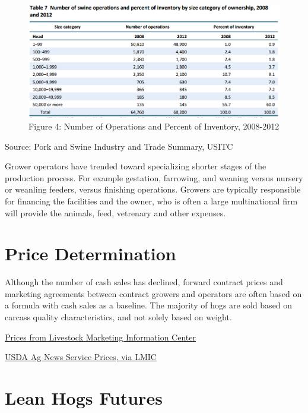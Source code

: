 \documentclass[
  letterpaper,
  DIV=11,
  numbers=noendperiod]{scrreprt}
\begin{document}
\begin{figure}

{\centering \includegraphics{images/numberoperations.png}

}

\caption{Figure 4: Number of Operations and Percent of Inventory,
2008-2012}

\end{figure}

Source: Pork and Swine Industry and Trade Summary, USITC

Grower operators have trended toward specializing shorter stages of the
production process. For example gestation, farrowing, and weaning versus
nursery or weanling feeders, versus finishing operations. Growers are
typically responsible for financing the facilities and the owner, who is
often a large multinational firm will provide the animals, feed,
vetrenary and other expenses.

\hypertarget{price-determination}{%
\section{Price Determination}\label{price-determination}}

Although the number of cash sales has declined, forward contract prices
and marketing agreements between contract growers and operators are
often based on a formula with cash sales as a baseline. The majority of
hogs are sold based on carcass quality characteristics, and not solely
based on weight.

\href{http://www.lmic.info/spreadsheet/prices-and-production}{Prices
from Livestock Marketing Information Center}

\href{http://www.lmic.info/quick_market_reports/hogs}{USDA Ag News
Service Prices, via LMIC}

\hypertarget{lean-hogs-futures}{%
\section{Lean Hogs Futures}\label{lean-hogs-futures}}
\end{document}

